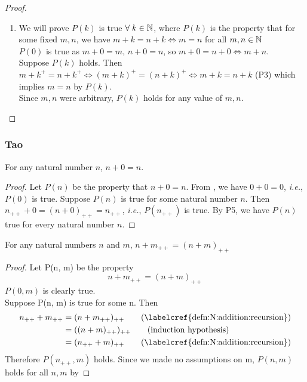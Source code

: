 \begin{proof}
    \begin{enumerate}[label=(\alph*)]
        \item[\labelcref{thm:N:cancellation}] We will prove $P(k)$ is true $\forall\; k \in \mathbb{N}$, where $P(k)$ is the property that for some fixed $m, n$, we have $m + k = n + k \iff m = n$ for all $m, n \in \mathbb{N}$ \\
        $P(0)$ is true as $m + 0 = m$, $n + 0 = n$, so $m + 0 = n + 0 \iff m + n$. \\
        Suppose $P(k)$ holds. Then $m + k^{+} = n + k^{+} \iff (m + k)^{+} = (n + k)^{+} \iff m + k = n + k$ (P3) which implies $m = n$ by $P(k)$. \\
        Since $m, n$ were arbitrary, $P(k)$ holds for any value of $m, n$.
        \qedhere
    \end{enumerate}
\end{proof}

\subsubsection{Tao} \vskip 0.5cm
\begin{lem} \label{thm:N:Tao:n+0=n}
For any natural number $n$, $n+0=n$.
\end{lem}

\begin{proof}
    Let $P(n)$ be the property that $n+0=n$. From , we have $0+0=0$, \emph{i.e.}, $P(0)$ is true. Suppose $P(n)$ is true for some natural number $n$. Then $n_{++}+0=(n+0)_{++}=n_{++}$, \emph{i.e.}, $P(n_{++})$ is true. By P5, we have $P(n)$ true for every natural number $n$.
\end{proof}

\begin{lem} \label{thm:N:Tao:n+S(m)=S(n+m)}
For any natural numbers $n$ and $m$, $n+m_{++}=(n+m)_{++}$
\end{lem}

\begin{proof}
    Let P(n, m) be the property
    \begin{equation*}
        n+m_{++}=(n+m)_{++}
    \end{equation*}
    $P(0, m)$ is clearly true. \\
    Suppose P(n, m) is true for some n. Then
    \begin{align*}
        n_{++}+m_{++} &= (n + m_{++})_{++}  \tag{\labelcref{defn:N:addition:recursion}} \\
                      &= ((n+m)_{++})_{++}  \tag{induction hypothesis} \\
                      &= (n_{++}+m)_{++}    \tag{\labelcref{defn:N:addition:recursion}}
    \end{align*}
    Therefore $P(n_{++}, m)$ holds. Since we made no assumptions on m, $P(n, m)$ holds for all $n, m$ by 
\end{proof}

